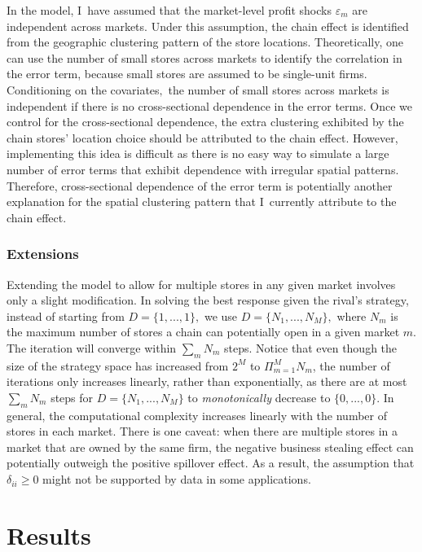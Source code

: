 \documentclass[notitlepage,onecolumn,11pt]{article}
\begin{document}
In the model, I\ have assumed that the market-level profit shocks $%
\varepsilon _{m}$ are independent across markets. Under this assumption, the
chain effect is identified from the geographic clustering pattern of the
store locations. Theoretically, one can use the number of small stores
across markets to identify the correlation in the error term, because small
stores are assumed to be single-unit firms. Conditioning on the covariates$,$
the number of small stores across markets is independent if there is no
cross-sectional dependence in the error terms. Once we control for the
cross-sectional dependence, the extra clustering exhibited by the chain
stores' location choice should be attributed to the chain effect. However,
implementing this idea is difficult as there is no easy way to simulate a
large number of error terms that exhibit dependence with irregular spatial
patterns. Therefore, cross-sectional dependence of the error term is
potentially another explanation for the spatial clustering pattern that I\
currently attribute to the chain effect.

\subsubsection{Extensions\label{Extension}}

Extending the model to allow for multiple stores in any given market
involves only a slight modification. In solving the best response given the
rival's strategy, instead of starting from $D=\{1,...,1\},$ we use $%
D=\{N_{1},...,N_{M}\},$ where $N_{m}$ is the maximum number of stores a
chain can potentially open in a given market $m$. The iteration will
converge within $\sum_{m}N_{m}$ steps. Notice that even though the size of
the strategy space has increased from $2^{M}$ to $\Pi _{m=1}^{M}N_{m}$, the
number of iterations only increases linearly, rather than exponentially, as
there are at most $\sum_{m}N_{m}$ steps for $D=\{N_{1},...,N_{M}\}$ to 
\textit{monotonically} decrease to $\{0,...,0\}.$ In general, the
computational complexity increases linearly with the number of stores in
each market. There is one caveat: when there are multiple stores in a market
that are owned by the same firm, the negative business stealing effect can
potentially outweigh the positive spillover effect. As a result, the
assumption that $\delta _{ii}\geq 0$ might not be supported by data in some
applications.

\section{Results}
\end{document}
